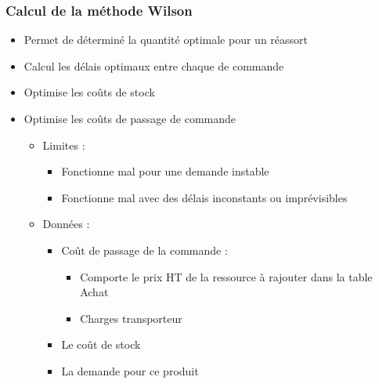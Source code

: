 \subsubsection{Calcul de la méthode Wilson}  

\begin{itemize}
	\item Permet de déterminé la quantité optimale pour un réassort 

	\item Calcul les délais optimaux entre chaque de commande 

	\item Optimise les coûts de stock 

	\item Optimise les coûts de passage de commande 
	
	\begin{itemize}
		\item Limites :
			\begin{itemize}
			
				\item Fonctionne mal pour une demande instable 

				\item Fonctionne mal avec des délais inconstants ou imprévisibles 			
			
			\end{itemize}
		\end{itemize}				 

	\begin{itemize}
		\item Données : 

			\begin{itemize}

				\item Coût de passage de la commande : 
	
					\begin{itemize}
						\item Comporte le prix HT de la ressource à rajouter dans la table Achat 

						\item Charges transporteur
					\end{itemize}
				
				\item Le coût de stock 

				\item La demande pour ce produit 
				
	\end{itemize}
	
	\end{itemize}
	
\end{itemize}





